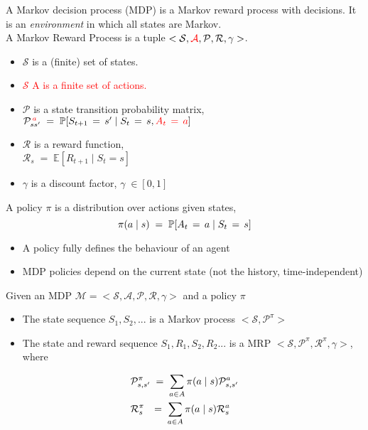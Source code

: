 \documentclass[landscape]{article}
\def\tcr{\textcolor{red}}
\def\tcb{\textcolor{blue}}
\begin{document}
\newpage
\newvgtitle{\tcb{Markov Decision Process}}
\LARGE
\vspace{-.5em}
\vspace{0.5cm}
A Markov decision process (MDP) is a Markov reward process with
decisions. It is an \textit{environment} in which all states are Markov.\\
A Markov Reward Process is a tuple $<\mathcal{S},\tcr{\mathcal{A}}, \mathcal{P}, \mathcal{R}, \gamma >$.\\
\begin{itemize}
    \item $\mathcal{S}$ is a (finite) set of states.\\
    \item \tcr{$\mathcal{S}$ A is a finite set of actions.}\\
    \item $\mathcal{P}$ is a state transition probability matrix,\\
    $\mathcal{P}_{ss'}^{\tcr{\,a}}\; =\; \mathbb{P}[S_{t+1}\,=\,s' \;|\; S_{t}\,=\,s , \tcr{A_t\,=\,a} ]$
    \item $\mathcal{R}$ is a reward function, \\ $\mathcal{R}_s \;=\; \mathbb{E}[R_{t+1}\;|\; S_t = s]$\\
    \item ${\gamma}$ is a discount factor, ${\gamma}\; \in [0,1]$
    
\end{itemize}
\vspace{0.5cm}

\newpage
\newvgtitle{\tcb{Policies}}
\LARGE
\vspace{-.5em}
\vspace{0.5cm}
A policy $\pi$ is a distribution over actions given states,
\begin{equation}\notag
    \pi(a\;|\;s)\;=\;\mathbb{P}[A_t \,=\,a \;|\;S_t\,=\,s]
\end{equation}
\begin{itemize}
    \item A policy fully defines the behaviour of an agent
    \item MDP policies depend on the current state (not the history, time-independent)
\end{itemize}
Given an MDP $\mathcal{M} = <\mathcal{S},\mathcal{A}, \mathcal{P}, \mathcal{R}, \gamma >$ and a policy $\pi$
\begin{itemize}
    \item The state sequence $S_1, S_2, ...$ is a Markov process $<\mathcal{S},\mathcal{P^\pi}>$
    \item The state and reward sequence $S_1, R_1, S_2, R_2 ...$ is a MRP $<\mathcal{S},\mathcal{P^\pi},
    \mathcal{R^\pi}, \gamma>$, where
\end{itemize}
\begin{align}\notag
   & \mathcal{P}_{s,s'}^\pi \;=\; \sum\limits_{a \in A} \pi(a\;|\;s)  \mathcal{P}_{s,s'}^a\\
   \notag
   & \mathcal{R}_s^\pi \;\;\,=\; \sum\limits_{a \in A} \pi(a\;|\;s)  \mathcal{R}_{s}^a
\end{align}
\end{document}
